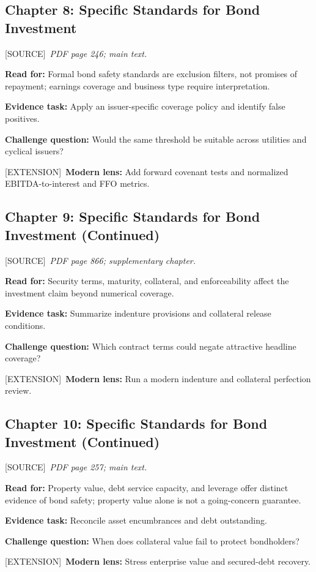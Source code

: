 \documentclass[11pt,letterpaper]{article}
\newcommand{\src}{\textsf{\color{sea}[SOURCE]}}
\newcommand{\ext}{\textsf{\color{gold}[EXTENSION]}}
\begin{document}
\subsection{Chapter 8: Specific Standards for Bond Investment}
\src\ \textit{PDF page 246; main text.}\par
\textbf{Read for:} Formal bond safety standards are exclusion filters, not promises of repayment; earnings coverage and business type require interpretation.\par
\textbf{Evidence task:} Apply an issuer-specific coverage policy and identify false positives.\par
\textbf{Challenge question:} Would the same threshold be suitable across utilities and cyclical issuers?\par
\ext\ \textbf{Modern lens:} Add forward covenant tests and normalized EBITDA-to-interest and FFO metrics.\par

\subsection{Chapter 9: Specific Standards for Bond Investment (Continued)}
\src\ \textit{PDF page 866; supplementary chapter.}\par
\textbf{Read for:} Security terms, maturity, collateral, and enforceability affect the investment claim beyond numerical coverage.\par
\textbf{Evidence task:} Summarize indenture provisions and collateral release conditions.\par
\textbf{Challenge question:} Which contract terms could negate attractive headline coverage?\par
\ext\ \textbf{Modern lens:} Run a modern indenture and collateral perfection review.\par

\subsection{Chapter 10: Specific Standards for Bond Investment (Continued)}
\src\ \textit{PDF page 257; main text.}\par
\textbf{Read for:} Property value, debt service capacity, and leverage offer distinct evidence of bond safety; property value alone is not a going-concern guarantee.\par
\textbf{Evidence task:} Reconcile asset encumbrances and debt outstanding.\par
\textbf{Challenge question:} When does collateral value fail to protect bondholders?\par
\ext\ \textbf{Modern lens:} Stress enterprise value and secured-debt recovery.\par
\end{document}
